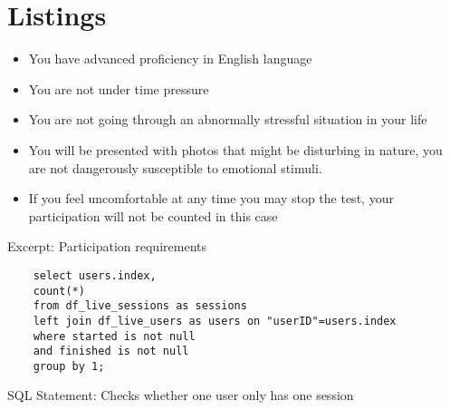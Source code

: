 \section{Listings}


\begin{listing}[ht!]
\begin{itemize}
	\item You have advanced proficiency in English language
	\item You are not under time pressure
	\item You are not going through an abnormally stressful situation in
	your life
	\item You will be presented with photos that might be disturbing in
	nature, you are not dangerously susceptible to emotional stimuli.
	\item If you feel uncomfortable at any time you may stop the test, your
	participation will not be counted in this case
\end{itemize}

\label{itm:participation_requirements}
\caption{Excerpt: Participation requirements}
\end{listing}


\begin{listing}[ht!]
	\begin{verbatim}
	select users.index, 
	count(*)
	from df_live_sessions as sessions
	left join df_live_users as users on "userID"=users.index 
	where started is not null
	and finished is not null
	group by 1;
	\end{verbatim}
	
	\label{itm:sql_check_single_session_per_user}
	\caption{SQL Statement: Checks whether one user only has one session}
\end{listing}